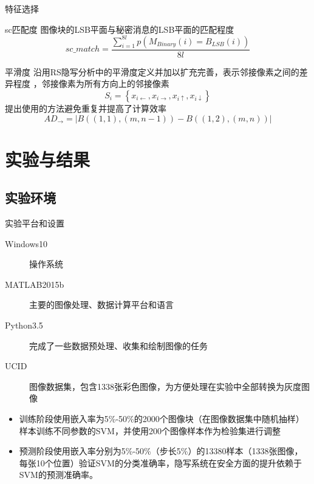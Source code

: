 \documentclass[14pt]{Bredelebeamer}
\begin{document}
\begin{frame}{特征选择}
	\begin{block}{sc匹配度}
	图像块的LSB平面与秘密消息的LSB平面的匹配程度
	$$sc\_match = \frac{{\sum\limits_{i = 1}^{8l} {p\left( {{M_{Binary}}\left( i \right) = {B_{LSB}}\left( i \right)} \right)} }}{{8l}}$$
	\end{block}

	\begin{exampleblock}{平滑度}
		沿用RS隐写分析中的平滑度定义并加以扩充完善，表示邻接像素之间的差异程度
	，邻接像素为所有方向上的邻接像素
	$${S_i} = \left\{ {x_{i \leftarrow}},{x_{i \to }},{x_{i \uparrow }},{x_{i \downarrow}}\right\}$$
	提出使用的方法避免重复并提高了计算效率
	$$A{D_ \to } = \left| {B\left( {\left( {1,1} \right),\left( {m,n - 1} \right)} \right) - B\left( {\left( {1,2} \right),\left( {m,n} \right)} \right)} \right|$$
	\end{exampleblock}
\end{frame}




\section{实验与结果}
\subsection{实验环境}
\begin{frame}{实验平台和设置}
	\begin{description}
		\item[Windows10] 操作系统
		\item[MATLAB2015b] 主要的图像处理、数据计算平台和语言
		\item[Python3.5] 完成了一些数据预处理、收集和绘制图像的任务
		\item[UCID] 图像数据集，包含1338张彩色图像，为方便处理在实验中全部转换为灰度图像
	\end{description}
	\begin{block}{}
		\begin{itemize}
			\item 训练阶段使用嵌入率为5\%-50\%的2000个图像块（在图像数据集中随机抽样）样本训练不同参数的SVM，并使用200个图像样本作为检验集进行调整
			\item 预测阶段使用嵌入率分别为5\%-50\%（步长5\%）的13380样本（1338张图像，每张10个位置）验证SVM的分类准确率，隐写系统在安全方面的提升依赖于SVM的预测准确率。
		\end{itemize}
	\end{block}
\end{frame}
\end{document}

